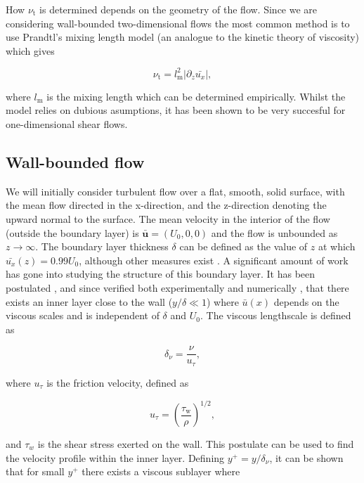 \documentclass[12pt]{article}
\begin{document}
How $\nu_{\text{t}}$ is determined depends on the geometry of the flow. Since we are considering wall-bounded two-dimensional flows the most common method is to use Prandtl's mixing length model \citep{Prandtl25} (an analogue to the kinetic theory of viscosity) which gives

\begin{equation}
\label{equ:mix_length}
\nu_{\text{t}} = l_{\text{m}}^{2} |\partial_{z} \bar{u_{x}}|,
\end{equation}

where $l_{\text{m}}$ is the mixing length which can be determined empirically. Whilst the model relies on dubious asumptions, it has been shown to be very succesful for one-dimensional shear flows. 

\subsection{Wall-bounded flow}
\label{subsec:wall}

We will initially consider turbulent flow over a flat, smooth, solid surface, with the mean flow directed in the x-direction, and the z-direction denoting the upward normal to the surface. The mean velocity in the interior of the flow (outside the boundary layer) is $\boldsymbol{\bar{u}} = (U_{0}, 0, 0)$ and the flow is unbounded as $z \to \infty$. The boundary layer thickness $\delta$ can be defined as the value of $z$ at which $\bar{u_{x}}(z) = 0.99 U_{0}$, although other measures exist \citep{Pope00}. A significant amount of work has gone into studying the structure of this boundary layer. It has been postulated \citep{Prandtl25}, and since verified both experimentally \citep{Wei89}and numerically \citep{Kim87}, that there exists an inner layer close to the wall ($y / \delta \ll 1$) where $\bar{u}(x)$ depends on the viscous scales and is independent of $\delta$ and $U_{0}$. The viscous lengthscale is defined as 

\begin{equation}
\label{equ:viscos_length}
\delta_{\nu} = \frac{\nu}{u_{\tau}},
\end{equation}

where $u_{\tau}$ is the friction velocity, defined as

\begin{equation}
\label{equ:frict_vel}
u_{\tau} = \left(\frac{\tau_{\text{w}}}{\rho}\right)^{1/2},
\end{equation}

and $\tau_{w}$ is the shear stress exerted on the wall. This postulate can be used to find the velocity profile within the inner layer. Defining $y^{+} = y / \delta_{\nu}$, it can be shown that for small $y^{+}$ there exists a viscous sublayer where \citep{Pope00}
\end{document}

